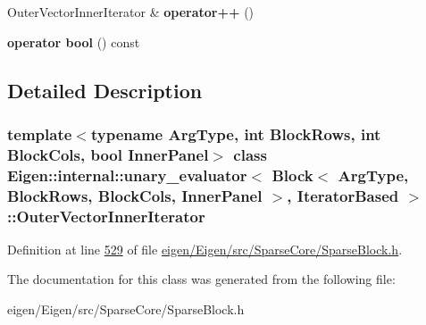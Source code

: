 \begin{DoxyCompactItemize}
Outer\+Vector\+Inner\+Iterator \& {\bfseries operator++} ()
\item 
\mbox{\label{class_eigen_1_1internal_1_1unary__evaluator_3_01_block_3_01_arg_type_00_01_block_rows_00_01_bloc652d26bcece9990189dc15f4df1c964f_a1f74114177a9c701e8d90a8856921c6d}} 
{\bfseries operator bool} () const
\end{DoxyCompactItemize}


\subsection{Detailed Description}
\subsubsection*{template$<$typename Arg\+Type, int Block\+Rows, int Block\+Cols, bool Inner\+Panel$>$\newline
class Eigen\+::internal\+::unary\+\_\+evaluator$<$ Block$<$ Arg\+Type, Block\+Rows, Block\+Cols, Inner\+Panel $>$, Iterator\+Based $>$\+::\+Outer\+Vector\+Inner\+Iterator}



Definition at line \hyperlink{eigen_2_eigen_2src_2_sparse_core_2_sparse_block_8h_source_l00529}{529} of file \hyperlink{eigen_2_eigen_2src_2_sparse_core_2_sparse_block_8h_source}{eigen/\+Eigen/src/\+Sparse\+Core/\+Sparse\+Block.\+h}.



The documentation for this class was generated from the following file\+:\begin{DoxyCompactItemize}
\item 
eigen/\+Eigen/src/\+Sparse\+Core/\+Sparse\+Block.\+h\end{DoxyCompactItemize}
